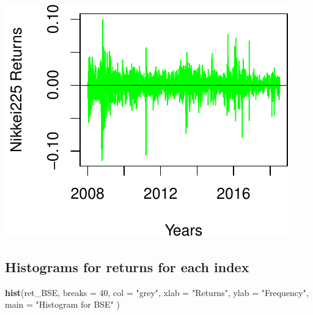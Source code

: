 \documentclass[11pt,]{article}
\newenvironment{Shaded}{\begin{snugshade}}{\end{snugshade}}
\newcommand{\KeywordTok}[1]{\textcolor[rgb]{0.13,0.29,0.53}{\textbf{#1}}}
\newcommand{\DataTypeTok}[1]{\textcolor[rgb]{0.13,0.29,0.53}{#1}}
\newcommand{\DecValTok}[1]{\textcolor[rgb]{0.00,0.00,0.81}{#1}}
\newcommand{\FloatTok}[1]{\textcolor[rgb]{0.00,0.00,0.81}{#1}}
\newcommand{\StringTok}[1]{\textcolor[rgb]{0.31,0.60,0.02}{#1}}
\newcommand{\CommentTok}[1]{\textcolor[rgb]{0.56,0.35,0.01}{\textit{#1}}}
\newcommand{\OperatorTok}[1]{\textcolor[rgb]{0.81,0.36,0.00}{\textbf{#1}}}
\newcommand{\NormalTok}[1]{#1}
\begin{document}
\begin{Shaded}
\end{Shaded}

\begin{center}\includegraphics{FMC_T4_PhD_Fin_Time_Series_files/figure-latex/return_market_index_func-2} \end{center}

\subsection{Histograms for returns for each
index}\label{histograms-for-returns-for-each-index}

\begin{Shaded}
\begin{Highlighting}[]
\KeywordTok{hist}\NormalTok{(ret_BSE,}
     \DataTypeTok{breaks =} \DecValTok{40}\NormalTok{,}
     \DataTypeTok{col =} \StringTok{"grey"}\NormalTok{,}
     \DataTypeTok{xlab =} \StringTok{"Returns"}\NormalTok{,}
     \DataTypeTok{ylab =} \StringTok{"Frequency"}\NormalTok{,}
     \DataTypeTok{main =} \StringTok{"Histogram for BSE"}
\NormalTok{     )}
\end{Highlighting}
\end{Shaded}
\end{document}
